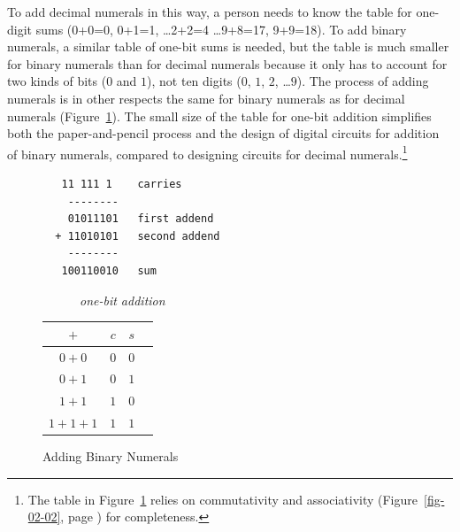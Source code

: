 To add decimal numerals in this way, a person needs to know
the table for one-digit sums (0+0=0, 0+1=1, \dots 2+2=4 \dots 9+8=17, 9+9=18).
To add binary numerals, a similar table of one-bit sums is needed,
but the table is much smaller for binary numerals
than for decimal numerals because it only has to account for
two kinds of bits ($0$ and $1$), not ten digits ($0$, $1$, $2$, \dots $9$).
The process of adding numerals is in other respects
the same for binary numerals as for decimal numerals
(Figure~\ref{fig:adding-binary-numerals}).
The small size of the table for one-bit addition simplifies
both the paper-and-pencil process and the design of
digital circuits for addition of binary numerals, compared to
designing circuits for decimal numerals.\footnote{The table
in Figure~\ref{fig:adding-binary-numerals}
relies on commutativity and associativity
(Figure~\ref{fig-02-02}, page \pageref{fig-02-02})
for completeness.}

\begin{figure}[!tbp]
\begin{center}
\begin{minipage}[b]{0.4\textwidth}
\begin{verbatim}
   11 111 1    carries
    --------
    01011101   first addend
  + 11010101   second addend
    --------
   100110010   sum
\end{verbatim}
\end{minipage}
\hfill
\begin{minipage}[b]{0.4\textwidth}
~~~~~~\emph{one-bit addition}\\
\vspace{.05 in}
\begin{tabular}{|c|c|c|c}
 \hline
 $+$      & $c$ & $s$ \\
 \hline
 $0+0$    & $0$ & $0$ \\
 \hline
 $0+1$    & $0$ & $1$ \\
 \hline
 $1+1$    & $1$ & $0$ \\
 \hline
 $1+1+1$  & $1$ & $1$ \\
 \hline
\end{tabular}
\end{minipage}
\end{center}
\caption{Adding Binary Numerals}
\label{fig:adding-binary-numerals}
\end{figure}

